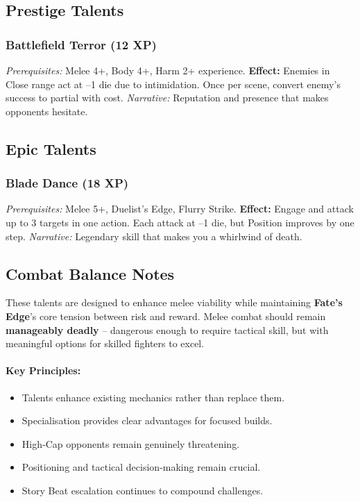 \subsection{Prestige Talents}

\subsubsection{Battlefield Terror (12 XP)}\label{talent:battlefield_terror}
\textit{Prerequisites:} Melee 4+, Body 4+, Harm 2+ experience.
\textbf{Effect:} Enemies in Close range act at --1 die due to intimidation. Once per scene, convert enemy's success to partial with cost.
\textit{Narrative:} Reputation and presence that makes opponents hesitate.

\subsection{Epic Talents}

\subsubsection{Blade Dance (18 XP)}\label{talent:blade_dance}
\textit{Prerequisites:} Melee 5+, Duelist's Edge, Flurry Strike.
\textbf{Effect:} Engage and attack up to 3 targets in one action. Each attack at --1 die, but Position improves by one step.
\textit{Narrative:} Legendary skill that makes you a whirlwind of death.

\subsection{Combat Balance Notes}
These talents are designed to enhance melee viability while maintaining \textbf{Fate's Edge}'s core tension between risk and reward. Melee combat should remain \textbf{manageably deadly} -- dangerous enough to require tactical skill, but with meaningful options for skilled fighters to excel.

\paragraph{Key Principles:}
\begin{itemize}
    \item Talents enhance existing mechanics rather than replace them.
    \item Specialisation provides clear advantages for focused builds.
    \item High‑Cap opponents remain genuinely threatening.
    \item Positioning and tactical decision‑making remain crucial.
    \item Story Beat escalation continues to compound challenges.
\end{itemize}

